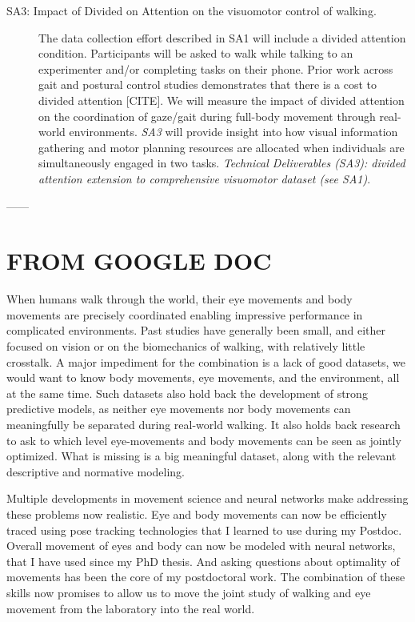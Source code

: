 \begin{description}
    \item[SA3: Impact of Divided on Attention on the visuomotor control of walking.] {The data collection effort described in SA1 will include a divided attention condition. Participants will be asked to walk while talking to an experimenter and/or completing tasks on their phone.  Prior work across gait and postural control studies demonstrates that there is a cost to divided attention [CITE]. We will measure the impact of divided attention on the coordination of gaze/gait during full-body movement through real-world environments. \textit{SA3} will provide insight into how visual information gathering and motor planning resources are allocated when individuals are simultaneously engaged in two tasks. \textit{Technical Deliverables (SA3): divided attention extension to comprehensive visuomotor dataset (see SA1)}}.


\end{description}



------

\section*{ FROM GOOGLE DOC}

When humans walk through the world, their eye movements and body movements are precisely coordinated enabling impressive performance in complicated environments. Past studies have generally been small, and either focused on vision or on the biomechanics of walking, with relatively little crosstalk. A major impediment for the combination is a lack of good datasets, we would want to know body movements, eye movements, and the environment, all at the same time. Such datasets also hold back the development of strong predictive models, as neither eye movements nor body movements can meaningfully be separated during real-world walking. It also holds back research to ask to which level eye-movements and body movements can be seen as jointly optimized. What is missing is a big meaningful dataset, along with the relevant descriptive and normative modeling.

Multiple developments in movement science and neural networks make addressing these problems now realistic. Eye and body movements can now be efficiently traced using pose tracking technologies that I learned to use during my Postdoc. Overall movement of eyes and body can now be modeled with neural networks, that I have used since my PhD thesis. And asking questions about optimality of movements has been the core of my postdoctoral work. The combination of these skills now promises to allow us to move the joint study of walking and eye movement from the laboratory into the real world.


